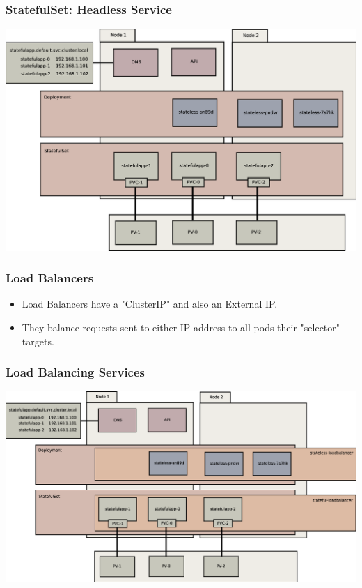 \documentclass{beamer}
\begin{document}
\begin{frame}
    \frametitle{StatefulSet: Headless Service}
    \includegraphics[width=\textwidth,height=0.85\textheight,keepaspectratio]{graphics/07-persistentIdentity.eps}
\end{frame}

\begin{frame}
    \frametitle{Load Balancers}
    \begin{itemize}
        \item Load Balancers have a "ClusterIP" and also an External IP.
        \item They balance requests sent to either IP address to all pods their "selector" targets.
    \end{itemize}
\end{frame}

\begin{frame}
    \frametitle{Load Balancing Services}
    \includegraphics[width=\textwidth,height=0.85\textheight,keepaspectratio]{graphics/08-loadBalancer.eps}
\end{frame}
\end{document}

